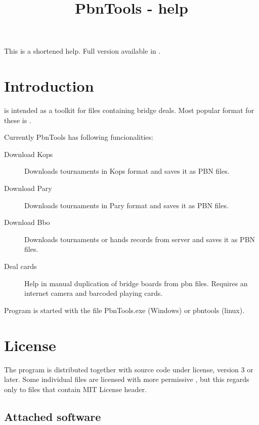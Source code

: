 \documentclass[polish,a4paper,11pt,oneside]{article}
\begin{document}
\title{PbnTools - help}
\author{\null}
\date{\null}


\maketitle

This is a shortened help. Full version available in .

\tableofcontents

\section{Introduction}
 is intended as a toolkit for files containing bridge deals.
Most popular format for these is .

Currently PbnTools has following funcionalities:

\begin{description}
\item[Download Kops]
  Downloads tournaments in Kops format and saves it as PBN files.
\item[Download Pary]
  Downloads tournaments in Pary format and saves it as PBN files.
\item[Download Bbo]
  Downloads tournaments or hands records from \bbolink
  server and saves it as PBN files.
\item[Deal cards]
  Help in manual duplication of bridge boards from pbn files.
  Requires an internet camera and barcoded playing cards.
\end{description}

Program is started with the file PbnTools.exe (Windows) or pbntools (linux).

\section{License}
The program is distributed together with source code
under  license,
version 3 or later.
Some individual files are licensed with more permissive
,
but this regards only to files that contain MIT License header.

\subsection{Attached software}
\end{document}
